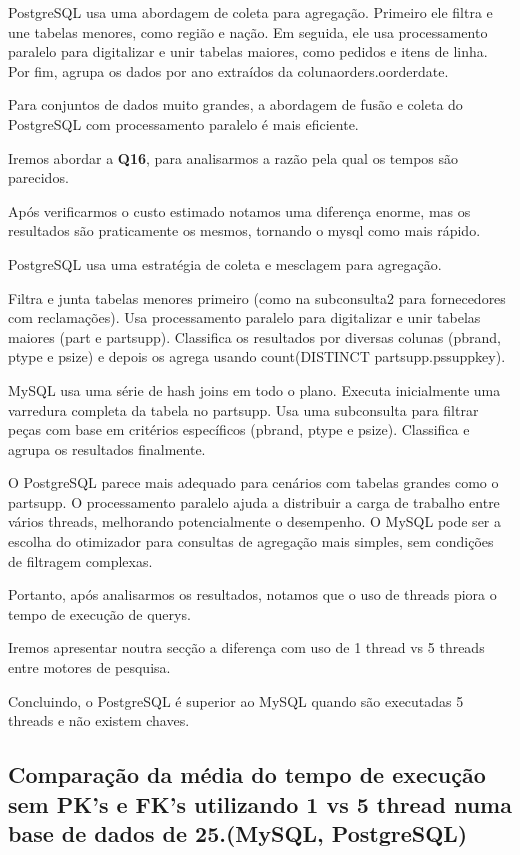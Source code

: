 \documentclass{article}
\begin{document}
PostgreSQL usa uma abordagem de coleta para agregação.
Primeiro ele filtra e une tabelas menores, como região e nação.
Em seguida, ele usa processamento paralelo para digitalizar e unir tabelas maiores, como pedidos e itens de linha.
Por fim, agrupa os dados por ano extraídos da colunaorders.o\underline{}orderdate.

Para conjuntos de dados muito grandes, a abordagem de fusão e coleta do PostgreSQL com processamento paralelo é mais eficiente.


Iremos abordar a \textbf{Q16}, para analisarmos a razão pela qual os tempos são parecidos.

Após verificarmos o custo estimado notamos uma diferença enorme, mas os resultados são praticamente os mesmos, tornando o mysql como mais rápido.

PostgreSQL usa uma estratégia de coleta e mesclagem para agregação.

Filtra e junta tabelas menores primeiro (como na subconsulta2 para fornecedores com reclamações).
Usa processamento paralelo para digitalizar e unir tabelas maiores (part e partsupp).
Classifica os resultados por diversas colunas (p\underline{}brand, p\underline{}type e p\underline{}size) e depois os agrega usando count(DISTINCT partsupp.ps\underline{}suppkey).


MySQL usa uma série de hash joins em todo o plano.
Executa inicialmente uma varredura completa da tabela no partsupp.
Usa uma subconsulta para filtrar peças com base em critérios específicos (p\underline{}brand, p\underline{}type e p\underline{}size).
Classifica e agrupa os resultados finalmente.

O PostgreSQL parece mais adequado para cenários com tabelas grandes como o partsupp. O processamento paralelo ajuda a distribuir a carga de trabalho entre vários threads, melhorando potencialmente o desempenho.
O MySQL pode ser a escolha do otimizador para consultas de agregação mais simples, sem condições de filtragem complexas.

Portanto, após analisarmos os resultados, notamos que o uso de threads piora o tempo de execução de querys.

Iremos apresentar noutra secção a diferença com uso de 1 thread vs 5 threads entre motores de pesquisa.

Concluindo, o PostgreSQL é superior ao MySQL quando são executadas 5 threads e não existem chaves.

\clearpage
  \subsection{Comparação da média do tempo de execução sem PK's e FK's
  utilizando 1 vs 5 thread numa base de dados de 25.(MySQL, PostgreSQL)}
  
\end{document}

